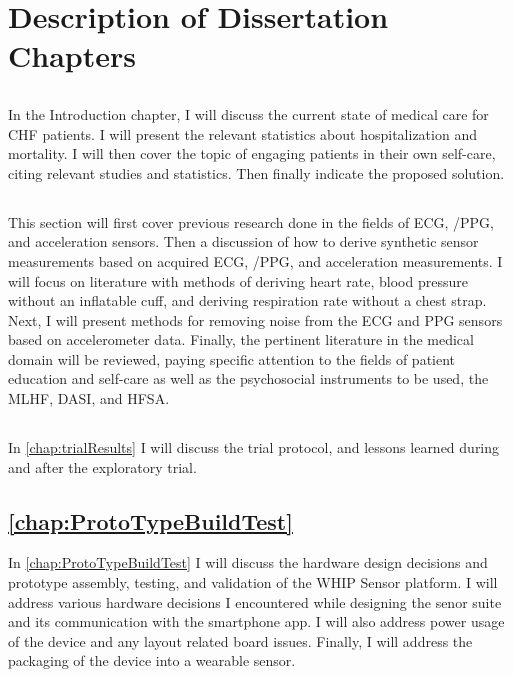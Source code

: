 \section{Description of Dissertation Chapters}

\subsection{ }
\label{subsec:Chapter1Introduction}
In the Introduction chapter, I will discuss the current state of medical care for CHF patients. I will present the relevant statistics about hospitalization and mortality. I will then cover the topic of engaging patients in their own self-care, citing relevant studies and statistics. Then finally indicate the proposed solution.

\subsection{ }
\label{subsec:Chapter2LitReview}
This section will first cover previous research done in the fields of ECG,  /PPG, and acceleration sensors. Then a discussion of how to derive synthetic sensor measurements based on acquired ECG,  /PPG, and acceleration measurements. I will focus on literature with methods of deriving heart rate, blood pressure without an inflatable cuff, and deriving respiration rate without a chest strap. Next, I will present methods for removing noise from the ECG and PPG sensors based on accelerometer data. Finally, the pertinent literature in the medical domain will be reviewed, paying specific attention to the fields of patient education and self-care as well as the psychosocial instruments to be used, the MLHF, DASI, and HFSA.

\subsection{ }
\label{subsec:Chapter3SystemDesignConcepts}
In \cref{chap:trialResults} I will discuss the trial protocol, and lessons learned during and after the exploratory trial.

\subsection{\cref{chap:ProtoTypeBuildTest} }
In \cref{chap:ProtoTypeBuildTest} I will discuss the hardware design decisions and prototype assembly, testing, and validation of the WHIP Sensor platform. I will address various hardware decisions I encountered while designing the senor suite and its communication with the smartphone app. I will also address power usage of the device and any layout related board issues. Finally, I will address the packaging of the device into a wearable sensor.

